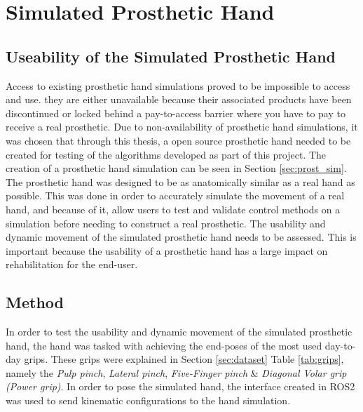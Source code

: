 \documentclass[../main.tex]{subfiles}
\begin{document}

\newpage
\section{Simulated Prosthetic Hand}
\label{sec:simtest}

\subsection{Useability of the Simulated Prosthetic Hand}

Access to existing prosthetic hand simulations proved to be impossible to access and use.
they are either unavailable because their associated products have been discontinued or locked behind a pay-to-access barrier where you have to pay to receive a real prosthetic.
Due to non-availability of prosthetic hand simulations, it was chosen that through this thesis, a open source prosthetic hand needed to be created for testing of the algorithms developed as part of this project.
The creation of a prosthetic hand simulation can be seen in Section \ref{sec:prost_sim}.
The prosthetic hand was designed to be as anatomically similar as a real hand as possible.
This was done in order to accurately simulate the movement of a real hand, and because of it, allow users to test and validate control methods on a simulation before needing to construct a real prosthetic.
The usability and dynamic movement of the simulated prosthetic hand needs to be assessed.
This is important because the usability of a prosthetic hand has a large impact on rehabilitation for the end-user.

\subsection{Method}
In order to test the usability and dynamic movement of the simulated prosthetic hand, the hand was tasked with achieving the end-poses of the most used day-to-day grips.
These grips were explained in Section \ref{sec:dataset} Table \ref{tab:grips}, namely the \textit{Pulp pinch}, \textit{Lateral pinch}, \textit{Five-Finger pinch} \& \textit{Diagonal Volar grip (Power grip)}.
In order to pose the simulated hand, the interface created in ROS2 was used to send kinematic configurations to the hand simulation.
\end{document}
